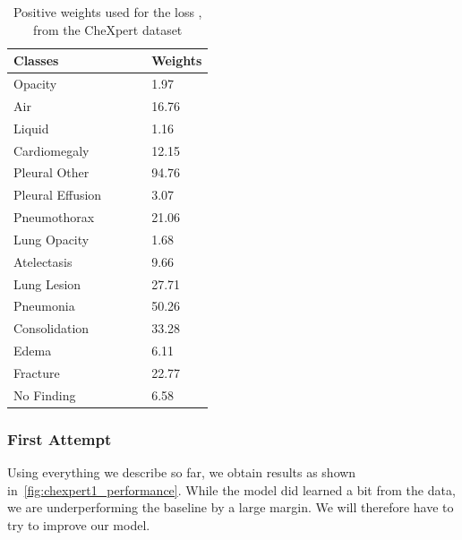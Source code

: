 \documentclass[11pt]{article}
\begin{document}
            \begin{table}[h!]
                \centering
                \begin{tabular}{@{}lllll@{}}
                \toprule
                Classes          & & & & Weights \\ \midrule
                Opacity          & & & & 1.97    \\
                Air              & & & & 16.76   \\
                Liquid           & & & & 1.16    \\
                Cardiomegaly     & & & & 12.15   \\
                Pleural Other    & & & & 94.76   \\
                Pleural Effusion & & & & 3.07    \\
                Pneumothorax     & & & & 21.06   \\
                Lung Opacity     & & & & 1.68    \\
                Atelectasis      & & & & 9.66    \\
                Lung Lesion      & & & & 27.71   \\
                Pneumonia        & & & & 50.26   \\
                Consolidation    & & & & 33.28   \\
                Edema            & & & & 6.11    \\
                Fracture         & & & & 22.77   \\
                No Finding       & & & & 6.58    \\ \bottomrule
                \end{tabular}
                \caption{Positive weights used for the loss , from the CheXpert dataset}
                \label{table:pos_weight_chexpert}
            \end{table}


            \subsubsection{First Attempt}
                Using everything we describe so far, we obtain results as shown in~\ref{fig:chexpert1_performance}.
                While the model did learned a bit from the data, we are underperforming the baseline by a large margin.
                We will therefore have to try to improve our model.
\end{document}
